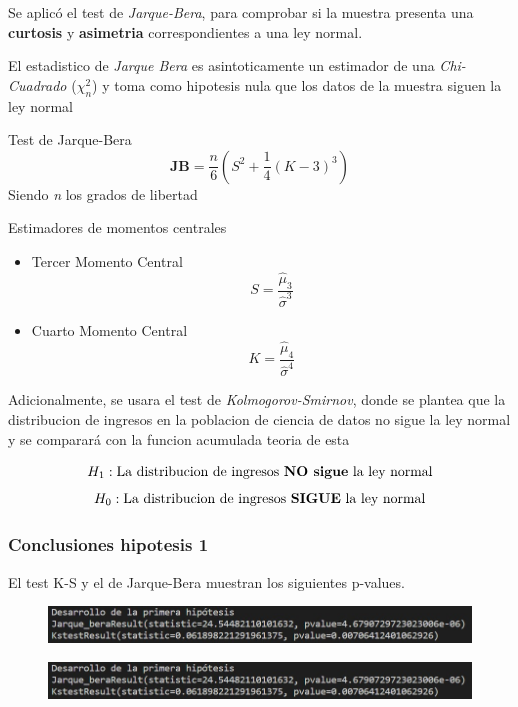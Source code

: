 \documentclass{beamer}
\begin{document}
\begin{frame}

  Se aplicó el test de \textit{Jarque-Bera}, para comprobar si la muestra
  presenta una \textbf{curtosis} y \textbf{asimetria} correspondientes
  a una ley normal.

  El estadistico de \textit{Jarque Bera} es asintoticamente un estimador de
  una \textit{Chi-Cuadrado} (${\chi_n ^ 2}$) y toma como hipotesis nula que los datos de la
  muestra siguen la ley normal

  \begin{alertblock}{Test de Jarque-Bera}
    \[\textbf{JB} = \frac{n}{6}(S^2 +\frac{1}{4}(K - 3)^3)\] Siendo \textit{n} los grados de libertad
  \end{alertblock}

  \begin{block}{Estimadores de momentos centrales}
    \begin{itemize}
        \item Tercer Momento Central
          \[S = \frac{\hat{\mu}_3}{\hat{\sigma}^3}\]

        \item  Cuarto Momento Central
         \[K = \frac{\hat{\mu}_4}{\hat{\sigma}^4}\]
    \end{itemize}
  \end{block}
\end{frame}

\begin{frame}
  Adicionalmente, se usara el test de \textit{Kolmogorov-Smirnov}, donde se plantea
  que la distribucion de ingresos en la poblacion de ciencia de datos
  no sigue la ley normal y se comparará con la funcion acumulada teoria
  de esta

  \[H_1: \textrm{La distribucion de ingresos \textbf{NO sigue} la ley normal}\]
  \[H_0: \textrm{La distribucion de ingresos \textbf{SIGUE} la ley normal}\]

\end{frame}

\begin{frame}
\frametitle{Conclusiones hipotesis 1}
  El test K-S y el de Jarque-Bera muestran los siguientes p-values.
  \begin{figure}[t]
        \includegraphics[width=12cm]{p-val-1.jpg}
    \end{figure}
    \begin{figure}[t]
          \includegraphics[width=12cm]{p-val-1.jpg}
      \end{figure}
    \end{frame}
\end{document}
